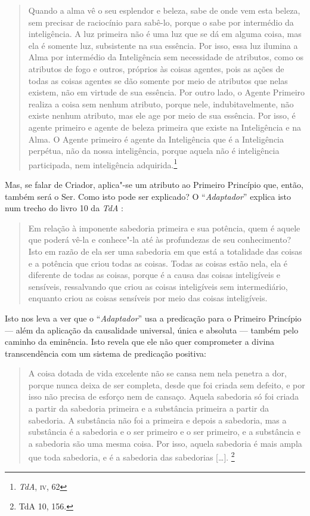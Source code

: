 \begin{quote}
Quando a alma vê o seu esplendor e beleza, sabe de onde vem esta
beleza, sem precisar de raciocínio para sabê-lo, porque o sabe
por intermédio da inteligência. A luz primeira não é uma luz que
se dá em alguma coisa, mas ela é somente luz, subsistente na sua
essência. Por isso, essa luz ilumina a Alma por intermédio da
Inteligência sem necessidade de atributos, como os atributos de
fogo e outros, próprios às coisas agentes, pois as ações de
todas as coisas agentes se dão somente por meio de atributos que
nelas existem, não em virtude de sua essência. Por outro lado, o
Agente Primeiro realiza a coisa sem nenhum atributo, porque
nele, indubitavelmente, não existe nenhum atributo, mas ele age
por meio de sua essência. Por isso, é agente primeiro e agente
de beleza primeira que existe na Inteligência e na Alma. O
Agente primeiro é agente da Inteligência que é a Inteligência
perpétua, não da nossa inteligência, porque aquela não é
inteligência participada, nem inteligência adquirida.\footnote{
\emph{TdA}, \textsc{iv}, 62} 
\end{quote}

Mas, se falar de Criador, aplica"-se um atributo ao Primeiro
Princípio que, então, também será o Ser. Como isto pode ser
explicado? O “\emph{Adaptador}” explica isto num trecho do
livro 10 da \emph{TdA} : 

\begin{quote}
Em relação à imponente sabedoria primeira e sua potência, quem é
aquele que poderá vê-la e conhece"-la até às profundezas de seu
conhecimento? Isto em razão de ela ser uma sabedoria em que está
a totalidade das coisas e a potência que criou todas as coisas.
Todas as coisas estão nela, ela é diferente de todas as coisas,
porque é a causa das coisas inteligíveis e sensíveis,
ressalvando que criou as coisas inteligíveis sem intermediário,
enquanto criou as coisas sensíveis por meio das coisas
inteligíveis.
\end{quote}

Isto nos leva a ver que o “\emph{Adaptador}” usa a predicação
para o Primeiro Princípio --- além da aplicação da causalidade
universal, única e absoluta --- também pelo caminho da eminência.
Isto revela que ele não quer comprometer a divina transcendência
com um sistema de predicação positiva:

\begin{quote}
A coisa dotada de vida excelente não se cansa nem nela penetra a
dor, porque nunca deixa de ser completa, desde que foi criada
sem defeito, e por isso não precisa de esforço nem de cansaço.
Aquela sabedoria só foi criada a partir da sabedoria primeira e
a substância primeira a partir da sabedoria. A substância não
foi a primeira e depois a sabedoria, mas a substância é a
sabedoria e o ser primeiro e o ser primeiro, e a substância e a
sabedoria são uma mesma coisa. Por isso, aquela sabedoria é mais
ampla que toda sabedoria, e é a sabedoria das sabedorias [\ldots{}].
\footnote{ TdA 10, 156.}
\end{quote}

